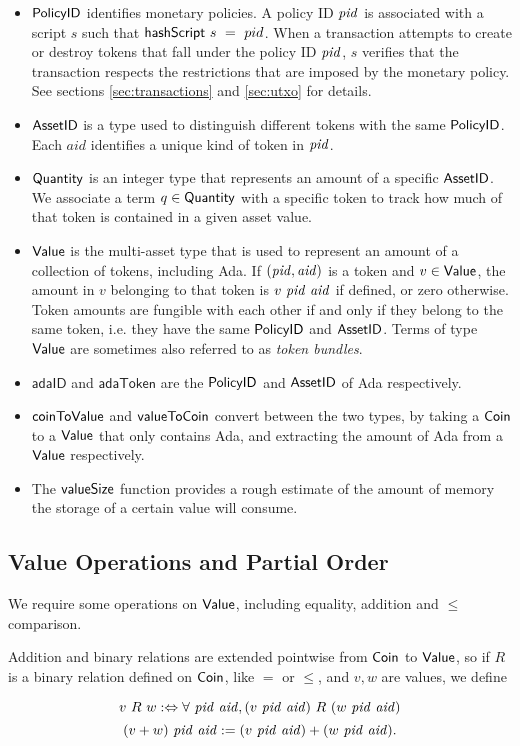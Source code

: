\begin{itemize}
  \item $\mathsf{PolicyID}$ identifies monetary policies. A policy ID $\mathit{pid}$ is associated with a script
    $s$ such that $\mathsf{hashScript}~s~=~pid$. When a transaction attempts to create or destroy tokens
    that fall under the policy ID $\mathit{pid}$,
    $s$ verifies that the transaction
    respects the restrictions that are imposed by the monetary policy.
    See sections \ref{sec:transactions} and \ref{sec:utxo} for details.

  \item $\mathsf{AssetID}$ is a type used to distinguish different tokens with the same $\mathsf{PolicyID}$.
    Each $aid$ identifies a unique kind of token in $\mathit{pid}$.

  \item $\mathsf{Quantity}$ is an integer type that represents an amount of a specific $\mathsf{AssetID}$. We associate
    a term $q\in\mathsf{Quantity}$ with a specific token to track how much of that token is contained in a given asset value.

  \item $\mathsf{Value}$ is the multi-asset type that is used to represent
    an amount of a collection of tokens, including Ada. If $(\mathit{pid}, \mathit{aid})$ is a token and $v \in \mathsf{Value}$,
    the amount in $v$ belonging to that token is $v~\mathit{pid}~\mathit{aid}$ if defined, or zero otherwise.
    Token amounts are fungible with each other if and only if they belong to the same token,
    i.e. they have the same $\mathsf{PolicyID}$ and $\mathsf{AssetID}$. Terms of type $\mathsf{Value}$ are sometimes also referred to as
    \emph{token bundles}.

  \item $\mathsf{adaID}$ and $\mathsf{adaToken}$ are the $\mathsf{PolicyID}$ and $\mathsf{AssetID}$ of Ada respectively.

  \item $\mathsf{coinToValue}$ and $\mathsf{valueToCoin}$ convert between the two types,
  by taking a $\mathsf{Coin}$ to a $\mathsf{Value}$ that only contains Ada, and extracting the amount of Ada from a $\mathsf{Value}$ respectively.

  \item The $\mathsf{valueSize}$ function provides a rough estimate of
    the amount of memory the storage of a certain value will consume.
\end{itemize}

\subsection*{Value Operations and Partial Order}
We require some operations on $\mathsf{Value}$, including equality, addition and $\leq$ comparison.

Addition and binary relations are extended pointwise from $\mathsf{Coin}$ to $\mathsf{Value}$, so if $R$ is a binary relation defined on $\mathsf{Coin}$, like $=$ or $\leq$, and $v, w$ are values, we define

\[ v~R~w :\Leftrightarrow \forall~\mathit{pid}~\mathit{aid}, (v~\mathit{pid}~\mathit{aid})~R~(w~\mathit{pid}~\mathit{aid}) \]
\[ (v + w)~\mathit{pid}~\mathit{aid} := (v~\mathit{pid}~\mathit{aid}) + (w~\mathit{pid}~\mathit{aid}). \]
